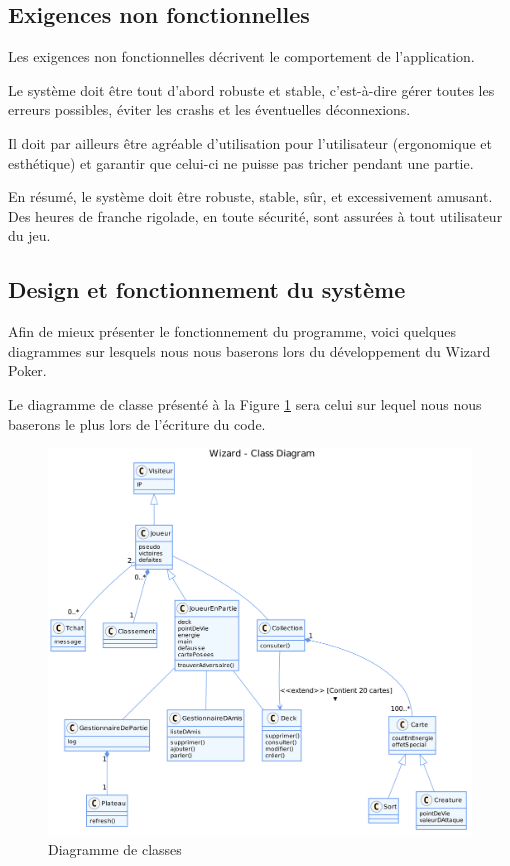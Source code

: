 \documentclass[11pt,a4paper]{article}
\begin{document}
\subsection{Exigences non fonctionnelles}
\label{sec:exi-nonfonc-sys}

Les exigences non fonctionnelles décrivent le comportement de
l'application.

\medbreak

Le système doit être tout d'abord robuste et stable, c'est-à-dire
gérer toutes les erreurs possibles, éviter les crashs et les éventuelles
déconnexions.

\medbreak

Il doit par ailleurs être agréable d'utilisation pour l'utilisateur
(ergonomique et esthétique) et garantir que celui-ci ne puisse
pas tricher pendant une partie.

\medbreak

En résumé, le système doit être robuste, stable, sûr, et excessivement amusant. Des
heures de franche rigolade, en toute sécurité, sont assurées à tout
utilisateur du jeu.

\subsection{Design et fonctionnement du système}
\label{sec:design}

Afin de mieux présenter le fonctionnement du programme, voici quelques
diagrammes sur lesquels nous nous baserons lors du
développement du Wizard Poker.

\medbreak

Le diagramme de classe présenté à la Figure \ref{fig:class} sera celui sur lequel nous nous baserons le plus lors de l'écriture du code.

\begin{figure}[ht]
  \centering
  \includegraphics[width=1\textwidth]{../uml_files/ClassDiagram.png}
  \caption{\label{fig:class} Diagramme de classes}
\end{figure}
\end{document}
